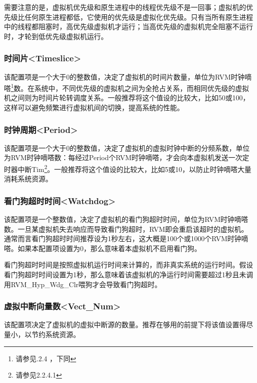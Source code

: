 需要注意的是，虚拟机优先级和原生进程中的线程优先级不是一回事；虚拟机的优先级比任何原生进程都低，它使用的优先级是虚拟化优先级。只有当所有原生进程中的线程都阻塞时，高优先级虚拟机才运行；当高优先级的虚拟机完全阻塞不运行时，才轮到低优先级虚拟机运行。

\subsubsection{时间片<Timeslice>{}}\label{subsubsec:5-3-15-4}

该配置项是一个大于0的整数值，决定了虚拟机的时间片数量，单位为RVM时钟嘀嗒\footnote{请参见.2.4
  ，下同}数。在系统中，不同优先级的虚拟机之间为全抢占关系，而相同优先级的虚拟机之间则为时间片轮转调度关系。一般推荐将这个值设的比较大，比如50或100，这样可以避免频繁进行虚拟机间的切换，提高系统的性能。

\subsubsection{时钟周期<Period>{}}\label{subsubsec:5-3-15-5}

该配置项是一个大于0的整数值，决定了虚拟机的虚拟时钟中断的分频系数，单位为RVM时钟嘀嗒数：每经过Period个RVM时钟嘀嗒，才会向本虚拟机发送一次定时器中断Tim\footnote{请参见2.2.4.1}。一般推荐将这个值设的比较大，比如5或10，以防止时钟嘀嗒大量消耗系统资源。

\subsubsection{看门狗超时时间<Watchdog>{}}\label{subsubsec:5-3-15-6}

该配置项是一个整数值，决定了虚拟机的看门狗超时时间，单位为RVM时钟嘀嗒数。一旦某虚拟机失去响应而导致看门狗超时，RVM即会重启该超时的虚拟机。通常而言看门狗超时时间推荐设为1秒左右，这大概是100个或1000个RVM时钟嘀嗒。如果本配置项设置为0，那么意味着本虚拟机不启用看门狗。

看门狗超时时间是按照虚拟机运行时间来计算的，而非真实系统的运行时间。假设看门狗超时时间设置为1秒，那么意味着该虚拟机的净运行时间需要超过1秒且未调用RVM\_Hyp\_Wdg\_Clr喂狗才会导致看门狗超时。

\subsubsection{虚拟中断向量数<Vect\_Num>{}}\label{subsubsec:5-3-15-7}

该配置项决定了虚拟机的虚拟中断源的数量。推荐在够用的前提下将该值设置得尽量小，以节约系统资源。

